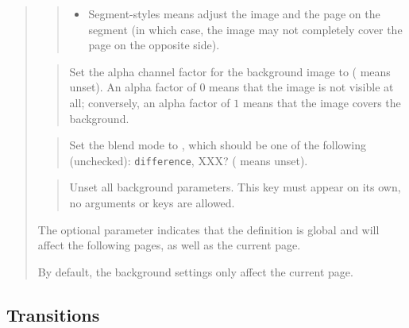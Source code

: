 \documentclass[12pt]{article}
\begin{document}
\begin{quote}
\begin{quote}
\begin {itemize}
\item Segment-styles means adjust the image and the page on the
segment (in which case, the image may not completely cover the page on
the opposite side).

\end {itemize}
\end{quote}

\begin{quote}
Set the alpha channel factor for the background image to 
( means unset). An alpha factor of $0$ means that the
image is not visible at all; conversely, an alpha factor of $1$ means that the
image covers the background.
\end{quote}

\begin{quote}
Set the blend mode to , which should be one of the
following (unchecked): {\tt difference}, XXX?
( means unset).
\end{quote}

\goodbreak
{}
\begin{quote}
Unset all background parameters.
This key must appear on its own, no arguments or keys are allowed. 
\end{quote}
The optional parameter  indicates that
the definition is global and will affect the following pages, 
as well as the current page.

By default, the background settings only affect the current page.
\end{quote}

\subsection {Transitions}
\end{document}
